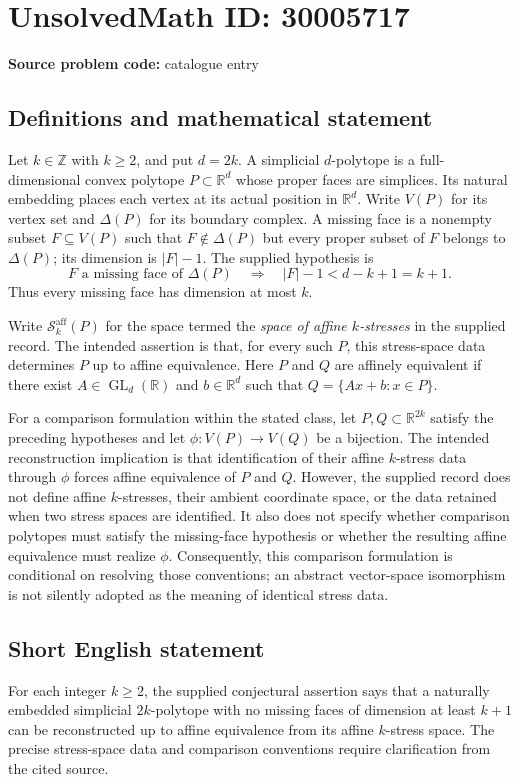 \documentclass[11pt]{article}
\newcommand{\Z}{\mathbb{Z}}
\newcommand{\R}{\mathbb{R}}
\begin{document}
\section*{UnsolvedMath ID: 30005717}
\textbf{Source problem code:} catalogue entry
\subsection{Definitions and mathematical statement}
Let \(k\in\Z\) with \(k\geq2\), and put \(d=2k\). A simplicial \(d\)-polytope is a full-dimensional convex polytope \(P\subset\R^d\) whose proper faces are simplices. Its natural embedding places each vertex at its actual position in \(\R^d\). Write \(V(P)\) for its vertex set and \(\Delta(P)\) for its boundary complex. A missing face is a nonempty subset \(F\subseteq V(P)\) such that \(F\notin\Delta(P)\) but every proper subset of \(F\) belongs to \(\Delta(P)\); its dimension is \(|F|-1\). The supplied hypothesis is
\[
F\text{ a missing face of }\Delta(P)\quad\Longrightarrow\quad |F|-1<d-k+1=k+1.
\]
Thus every missing face has dimension at most \(k\).

Write \(\mathcal S_k^{\mathrm{aff}}(P)\) for the space termed the \emph{space of affine \(k\)-stresses} in the supplied record. The intended assertion is that, for every such \(P\), this stress-space data determines \(P\) up to affine equivalence. Here \(P\) and \(Q\) are affinely equivalent if there exist \(A\in\operatorname{GL}_d(\R)\) and \(b\in\R^d\) such that \(Q=\{Ax+b:x\in P\}\).

For a comparison formulation within the stated class, let \(P,Q\subset\R^{2k}\) satisfy the preceding hypotheses and let \(\phi:V(P)\to V(Q)\) be a bijection. The intended reconstruction implication is that identification of their affine \(k\)-stress data through \(\phi\) forces affine equivalence of \(P\) and \(Q\). However, the supplied record does not define affine \(k\)-stresses, their ambient coordinate space, or the data retained when two stress spaces are identified. It also does not specify whether comparison polytopes must satisfy the missing-face hypothesis or whether the resulting affine equivalence must realize \(\phi\). Consequently, this comparison formulation is conditional on resolving those conventions; an abstract vector-space isomorphism is not silently adopted as the meaning of identical stress data.
\subsection{Short English statement}
For each integer \(k\geq2\), the supplied conjectural assertion says that a naturally embedded simplicial \(2k\)-polytope with no missing faces of dimension at least \(k+1\) can be reconstructed up to affine equivalence from its affine \(k\)-stress space. The precise stress-space data and comparison conventions require clarification from the cited source.
\end{document}
